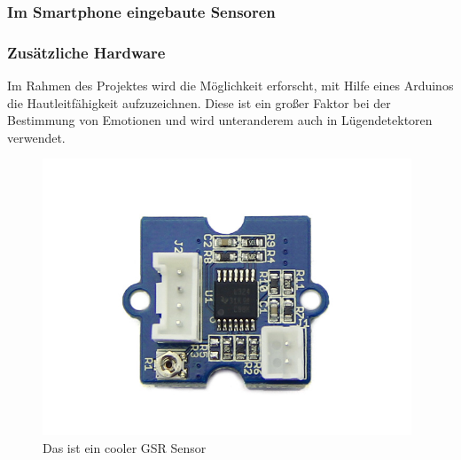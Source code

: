 \subsubsection{Im Smartphone eingebaute Sensoren}
\subsubsection{Zusätzliche Hardware}
Im Rahmen des Projektes wird die Möglichkeit erforscht, mit Hilfe eines Arduinos die Hautleitfähigkeit aufzuzeichnen. 
Diese ist ein großer Faktor bei der Bestimmung von Emotionen und wird unteranderem auch in Lügendetektoren verwendet. 
\begin{figure}[h]
	\centering
	\includegraphics[width=11cm]{Bilder/sensor.jpg}
	\caption{Das ist ein cooler GSR Sensor}
\end{figure}%
